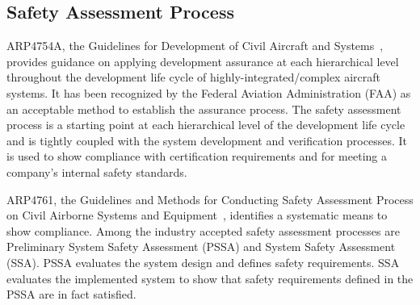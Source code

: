 \subsection{Safety Assessment Process}
\label{subsec:process}

ARP4754A, the Guidelines for Development of Civil Aircraft and Systems~\cite{SAE:ARP4754A}, provides guidance on applying development assurance at each hierarchical level throughout the development life cycle of highly-integrated/complex aircraft systems. It has been recognized by the Federal Aviation Administration (FAA) as an acceptable method to establish the assurance process. The safety assessment process is a starting point at each hierarchical level of the development life cycle and is tightly coupled with the system development and verification processes. It is used to show compliance with certification requirements and for meeting a company's internal safety standards. 

ARP4761, the Guidelines and Methods for Conducting Safety Assessment Process on Civil Airborne Systems and Equipment~\cite{SAE:ARP4761},  identifies a systematic means to show compliance. Among the industry accepted safety assessment processes are Preliminary System Safety Assessment (PSSA) and System Safety Assessment (SSA). PSSA evaluates the system design and defines safety requirements. SSA evaluates the implemented system to show that safety requirements defined in the PSSA are in fact satisfied.

	


